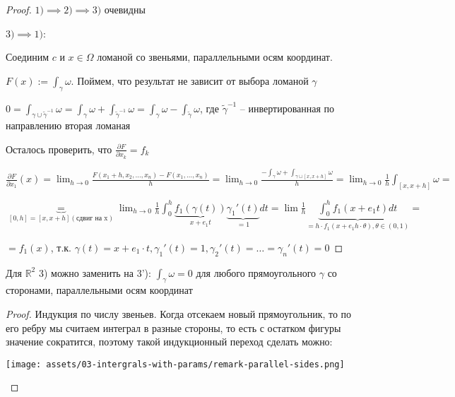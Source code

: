 \begin{proof}
    $1) \implies 2) \implies 3)$ очевидны

    $3) \implies 1)$: 

    Соединим $c$ и $x \in \Omega$ ломаной со звеньями, параллельными осям координат. 
    
    $F(x) := \int_{\gamma}^{}\omega$. Поймем, что результат не зависит от выбора ломаной $\gamma$

    $0 = \int_{\gamma \cup \tilde{\gamma}^{-1}}^{}\omega = \int_{\gamma}^{}\omega + \int_{\tilde{\gamma}^{-1}}^{}\omega = \int_{\gamma}^{}\omega - \int_{\tilde{\gamma}}^{}\omega$, где $\tilde{\gamma}^{-1}$ -- инвертированная по направлению вторая ломаная

    Осталось проверить, что $\frac{\partial F}{\partial x_k} = f_k$

    $\frac{\partial F}{\partial x_1}(x) = \lim_{h \to 0} \frac{F(x_1 + h, x_2, \dots, x_n) - F(x_1, \dots, x_n)}{h} = \lim_{h \to 0} \frac{-\int_{\gamma}^{}\omega + \int_{\gamma \sqcup [x, x + h]}^{}\omega}{h} = \lim_{h \to 0} \frac{1}{h}\int_{[x, x + h]}^{}\omega =$
    
    $ \underbrace{=}_{[0, h] = [x, x + h] (\text{сдвиг на x})} \lim_{h \to 0} \frac{1}{h}\int_{0}^{h}\underbrace{f_1(\gamma(t))}_{x + e_1t}\underbrace{\gamma_1'(t)}_{= 1}dt = \lim \frac{1}{h}\underbrace{\int_{0}^{h}f_1(x + e_1t)dt}_{= h \cdot f_1(x + e_1h\cdot\theta), \theta \in (0, 1)} =$
    
    $ = f_1(x)$, т.к. $\gamma(t) = x + e_1 \cdot t, \gamma_1'(t) = 1, \gamma_2'(t) = \dots = \gamma_n'(t) = 0$
\end{proof}

\begin{remark}
    Для $\mathbb{R}^2$ 3) можно заменить на 3'): $\int_{\gamma}^{}\omega = 0$ для любого прямоугольного $\gamma$ со сторонами, параллельными осям координат
\end{remark}

\begin{proof}
    Индукция по числу звеньев. Когда отсекаем новый прямоугольник, то по его ребру мы считаем интеграл в разные стороны, то есть с остатком фигуры значение сократится, поэтому такой индукционный переход сделать можно:

    \begin{center}
        \texttt{[image: assets/03-intergrals-with-params/remark-parallel-sides.png]}
    \end{center}
\end{proof}

